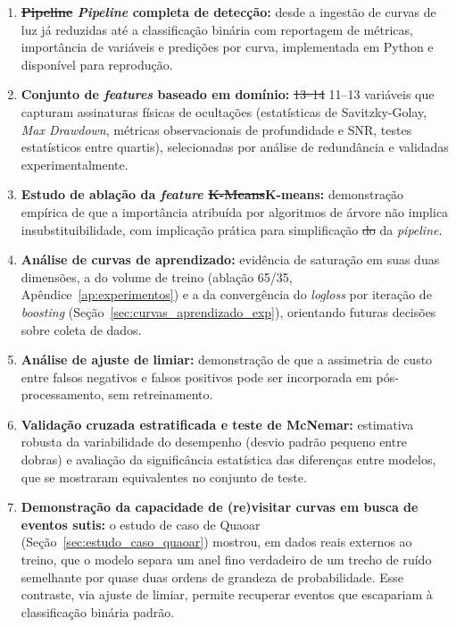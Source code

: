 \documentclass[msc]{on} %
\makeatletter
\providecommand{\DIFaddtex}[1]{{\protect\color{red}#1}} %
\providecommand{\DIFdeltex}[1]{{\protect\color{red}\sout{#1}}} %
\providecommand{\DIFaddbegin}{} %
\providecommand{\DIFaddend}{} %
\providecommand{\DIFdelbegin}{} %
\providecommand{\DIFdelend}{} %
\providecommand{\DIFadd}[1]{\texorpdfstring{\DIFaddtex{#1}}{#1}} %
\providecommand{\DIFdel}[1]{\texorpdfstring{\DIFdeltex{#1}}{}} %
\let\sout@orig\sout %
\renewcommand{\sout}[1]{\ifmmode\text{\sout@orig{\ensuremath{#1}}}\else\sout@orig{#1}\fi} %
\makeatother
\begin{document}
\begin{enumerate}
	\item \textbf{\DIFdelbegin \DIFdel{Pipeline }\DIFdelend \DIFaddbegin \textit{\DIFadd{Pipeline}} \DIFaddend completa de detecção:} desde a ingestão de curvas de luz já reduzidas até a classificação binária com reportagem de métricas, importância de variáveis e predições por curva, implementada em Python e disponível para reprodução.

	\item \textbf{Conjunto de \textit{features} baseado em domínio:} \DIFdelbegin \DIFdel{13--14 }\DIFdelend \DIFaddbegin \DIFadd{11--13 }\DIFaddend variáveis que capturam assinaturas físicas de ocultações (estatísticas de Savitzky-Golay, \textit{Max Drawdown}, métricas observacionais de profundidade e SNR, testes estatísticos entre quartis), selecionadas por análise de redundância e validadas experimentalmente.

	\item \textbf{Estudo de ablação da \textit{feature} \DIFdelbegin \DIFdel{K-Means}\DIFdelend \DIFaddbegin \DIFadd{K-means}\DIFaddend :} demonstração empírica de que a importância atribuída por algoritmos de árvore não implica insubstituibilidade, com implicação prática para simplificação \DIFdelbegin \DIFdel{do }\DIFdelend \DIFaddbegin \DIFadd{da }\DIFaddend \textit{pipeline}.

	\item \textbf{Análise de curvas de aprendizado:} evidência de saturação em suas duas dimensões, a do volume de treino (ablação 65/35, Apêndice~\ref{ap:experimentos}) e a da convergência do \textit{logloss} por iteração de \textit{boosting} (Seção~\ref{sec:curvas_aprendizado_exp}), orientando futuras decisões sobre coleta de dados.

	\item \textbf{Análise de ajuste de limiar:} demonstração de que a assimetria de custo entre falsos negativos e falsos positivos pode ser incorporada em pós-processamento, sem retreinamento.

	\item \textbf{Validação cruzada estratificada e teste de McNemar:} estimativa robusta da variabilidade do desempenho (desvio padrão pequeno entre dobras) e avaliação da significância estatística das diferenças entre modelos, que se mostraram equivalentes no conjunto de teste.

	\item \textbf{Demonstração da capacidade de (re)visitar curvas em busca de eventos sutis:} o estudo de caso de Quaoar (Seção~\ref{sec:estudo_caso_quaoar}) mostrou, em dados reais externos ao treino, que o modelo separa um anel fino verdadeiro de um trecho de ruído semelhante por quase duas ordens de grandeza de probabilidade. Esse contraste, via ajuste de limiar, permite recuperar eventos que escapariam à classificação binária padrão.
\end{enumerate}
\end{document}
